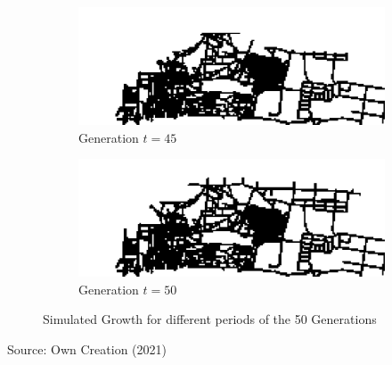 \begin{figure}[H]
\begin{subfigure}{.5\textwidth}
  \centering
  \includegraphics[width=1\linewidth]{Figures/Chapter4/generation-45-melusi}
  \caption{Generation $t = 45$}
\end{subfigure}
\begin{subfigure}{.5\textwidth}
  \centering
  \includegraphics[width=1\linewidth]{Figures/Chapter4/generation-50-melusi}
  \caption{Generation $t = 50$}
\end{subfigure}
\caption{Simulated Growth for different periods of the 50 Generations}
\label{fig:gen50}
\end{figure}
\begin{center}
Source: Own Creation (2021)
\end{center}

